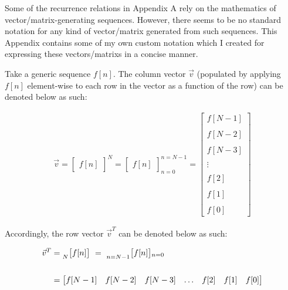 \documentclass{article}
\begin{document}
\hspace{5mm} Some of the recurrence relations in Appendix A rely on the mathematics of vector/matrix-generating sequences. However, there seems to be no standard notation for any kind of vector/matrix generated from such sequences. This Appendix contains some of my own custom notation which I created for expressing these vectors/matrixs in a concise manner.\newline 

Take a generic sequence $f[n]$. The column vector $\vec{v}$ (populated by applying $f[n]$ element-wise to each row in the vector as a function of the row) can be denoted below as such:

\begin{align*}
    \vec{v} = \begin{bmatrix} f[n] \end{bmatrix}^{N}
            = \begin{bmatrix} f[n] \end{bmatrix}^{n=N - 1}_{n=0}
            = \begin{bmatrix}
                    f[N - 1] \\ \\
                    f[N - 2] \\ \\
                    f[N - 3] \\ \\
                      \vdots \\ \\
                    f[    2] \\ \\
                    f[    1] \\ \\
                    f[    0] 
                \end{bmatrix}
  \end{align*}

Accordingly, the row vector $\vec{v}^{T}$ can be denoted below as such:

\begin{align*}
    \vec{v}^{T}&=   \prescript{}{N}{\begin{bmatrix} f[n] \end{bmatrix}} \ 
                = \ \prescript{}{n=N - 1}{\begin{bmatrix} f[n] \end{bmatrix}}_{n=0} \\ \\
               &= \begin{bmatrix} f[N - 1] & f[N - 2] & f[N - 3] & \ldots & f[2] & f[1] & f[0] \end{bmatrix} \\
  \end{align*} 
\end{document}
